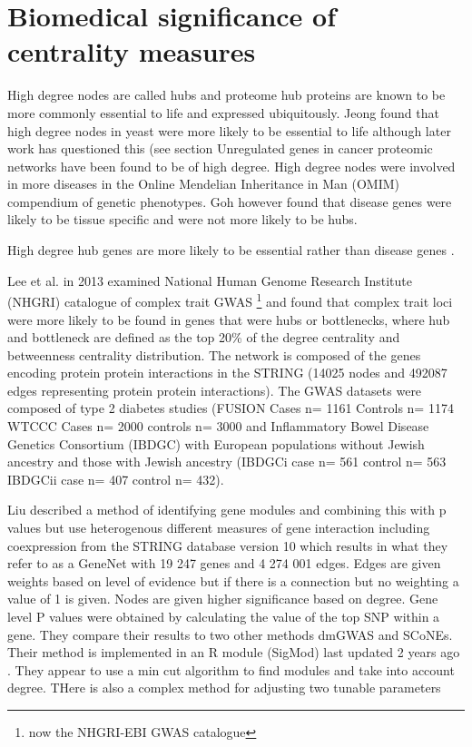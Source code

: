 \section{Biomedical significance of centrality measures}

 High degree nodes are called hubs and proteome hub proteins are known to be more commonly essential to life \cite{jeong2001lethality} and expressed ubiquitously. \cite{goh2007human}  Jeong found that high degree nodes in yeast were more likely to be essential to life \cite{jeong2001lethality} although later work has questioned this (see section Unregulated genes in cancer proteomic networks have been found to be of high degree. \cite{wachi2005interactome}  High degree nodes were  involved in more diseases in the Online Mendelian Inheritance in Man (OMIM) compendium of genetic phenotypes. \cite{xu2006discovering}  Goh however found that disease genes were likely to be tissue specific and were not more likely to be hubs. \cite{goh2007human}  
 
High degree hub genes are more likely to be essential rather than disease genes \cite{barabasi2011network}. 

Lee et al. \cite{lee2013network} in 2013 examined National Human Genome Research Institute (NHGRI)  catalogue of complex trait GWAS \footnote{now the NHGRI-EBI GWAS catalogue} and found that complex trait loci were more likely to be found in genes that were hubs or bottlenecks, where hub and bottleneck are defined as the top 20\% of the degree centrality and betweenness centrality distribution.  The network is composed of the genes encoding protein protein interactions in the STRING (14025 nodes and 492087 edges representing protein protein interactions). The GWAS datasets were composed of type 2 diabetes studies (FUSION  Cases n=	1161 Controls n=	1174 
WTCCC Cases n=	2000 controls n=	3000  and Inflammatory Bowel Disease Genetics Consortium (IBDGC) with European populations without Jewish ancestry and those with Jewish ancestry (IBDGCi case n=	561 control n=	563 IBDGCii case n= 	407 control n=	432).  

Liu \cite{liu2017sigmod} described a method of identifying gene modules and combining this with p values but use heterogenous different measures of gene interaction including coexpression from the STRING database version 10 which results in what they refer to as a GeneNet  with 19 247 genes and 4 274 001 edges. Edges are given weights based on level of evidence but if there is a connection but no weighting a value of 1 is given. Nodes are given higher significance based on degree.  Gene level P values were obtained by calculating the value of the top SNP within a gene. They compare their results to two other methods dmGWAS and SCoNEs. Their method is implemented in an R module (SigMod) last updated 2 years ago . They appear to use a min cut algorithm to find modules and take into account degree. THere is also a complex method for adjusting two tunable parameters 



